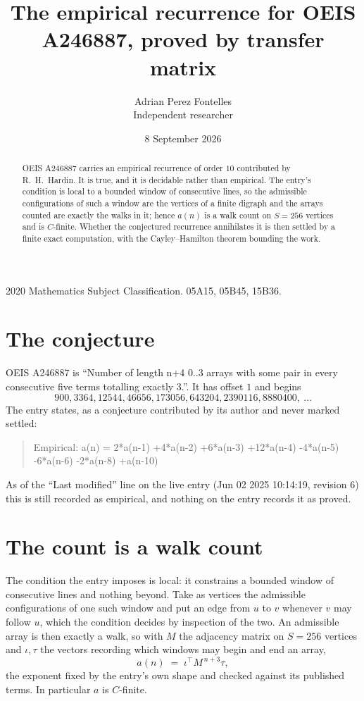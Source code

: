 \documentclass[11pt,a4paper]{article}
\title{The empirical recurrence for OEIS A246887, proved by transfer matrix}
\author{Adrian Perez Fontelles\\ \small Independent researcher}
\date{8 September 2026}
\theoremstyle{plain}
\theoremstyle{definition}
\begin{document}
\maketitle

\begin{abstract}
OEIS A246887 carries an empirical recurrence of order $10$ contributed by R.~H.~Hardin. It is
true, and it is decidable rather than empirical. The entry's condition is local to a bounded window of consecutive lines, so
the admissible configurations of such a window are the vertices of a finite digraph and the
arrays counted are exactly the walks in it; hence $a(n)$ is a walk count on $S=256$ vertices
and is $C$-finite. Whether the conjectured recurrence annihilates it is then settled by a
finite exact computation, with the Cayley--Hamilton theorem bounding the work.
\end{abstract}

\noindent\small 2020 Mathematics Subject Classification. 05A15, 05B45, 15B36.\normalsize

\section{The conjecture}

OEIS A246887 is ``Number of length n+4 0..3 arrays with some pair in every consecutive five terms totalling exactly 3.''. It has offset $1$ and begins
\[
900, 3364, 12544, 46656, 173056, 643204, 2390116, 8880400,\ \dots
\]
The entry states, as a conjecture contributed by its author and never marked settled:
\begin{quote}
Empirical: a(n) = 2*a(n-1) +4*a(n-2) +6*a(n-3) +12*a(n-4) -4*a(n-5) -6*a(n-6) -2*a(n-8) +a(n-10)
\end{quote}
As of the ``Last modified'' line on the live entry (Jun 02 2025 10:14:19, revision 6) this is still
recorded as empirical, and nothing on the entry records it as proved.

\section{The count is a walk count}

The condition the entry imposes is local: it constrains a bounded window of consecutive lines and nothing beyond. Take as
vertices the admissible configurations of one such window and put an edge from $u$ to $v$
whenever $v$ may follow $u$, which the condition decides by inspection of the two. An
admissible array is then exactly a walk, so with $M$ the adjacency matrix on $S=256$ vertices
and $\iota,\tau$ the vectors recording which windows may begin and end an array,
\[
a(n)\;=\;\iota^{\!\top}M^{\,n+3}\tau ,
\]
the exponent fixed by the entry's own shape and checked against its published terms. In
particular $a$ is $C$-finite.
\end{document}
